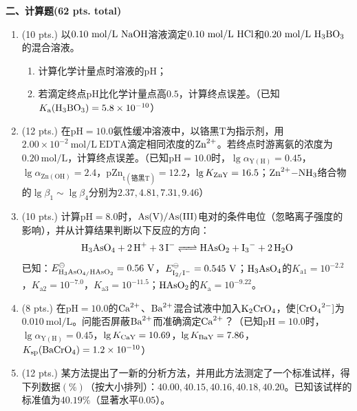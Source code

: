 \vspace{0.5cm}
\noindent\textbf{二、计算题(62 pts. total)}

\begin{enumerate}[label=\arabic*., itemsep=1.5ex]
    \item (10 pts.) 以$0.10\ \mathrm{mol/L}\ \ce{NaOH}$溶液滴定$0.10\ \mathrm{mol/L}\ \ce{HCl}$和$0.20\ \mathrm{mol/L}\ \ce{H3BO3}$的混合溶液。
    \begin{enumerate}[label=(\arabic*), noitemsep, topsep=0pt, partopsep=0pt]
        \item 计算化学计量点时溶液的$\mathrm{pH}$；
        \item 若滴定终点$\mathrm{pH}$比化学计量点高$0.5$，计算终点误差。（已知$K_\mathrm{a}(\ce{H3BO3})=5.8\times10^{-10}$）
    \end{enumerate}
    \item (12 pts.) 在$\mathrm{pH}=10.0$氨性缓冲溶液中，以铬黑$\mathrm{T}$为指示剂，用$2.00\times10^{-2}\ \mathrm{mol/L}\ \mathrm{EDTA}$滴定相同浓度的$\ce{Zn^{2+}}$。若终点时游离氨的浓度为$0.20\ \mathrm{mol/L}$，计算终点误差。（已知$\mathrm{pH}=10.0$时，$\lg\alpha_{\mathrm{Y(H)}}=0.45$，$\lg\alpha_{\mathrm{Zn(OH)}}=2.4$，$\mathrm{pZn_{t(\text{铬黑T})}}=12.2$，$\lg K_{\ce{ZnY}}=16.5$；$\ce{Zn^{2+}-NH3}$络合物的$\lg\beta_1 \sim \lg\beta_4$分别为$2.37, 4.81, 7.31, 9.46$）
    \item (10 pts.) 计算$\mathrm{pH}=8.0$时，$\ce{As(V)/As(III)}$电对的条件电位（忽略离子强度的影响），并从计算结果判断以下反应的方向：
    \[
    \ce{H3AsO4 + 2H+ + 3I- <=> HAsO2 + I3- + 2H2O}
    \]
    已知：$E^\ominus_{\ce{H3AsO4/HAsO2}}=0.56\ \mathrm{V}$，$E^\ominus_{\ce{I2/I-}}=0.545\ \mathrm{V}$；$\ce{H3AsO4}$的$K_{\mathrm{a1}}=10^{-2.2}$，$K_{\mathrm{a2}}=10^{-7.0}$，$K_{\mathrm{a3}}=10^{-11.5}$；$\ce{HAsO2}$的$K_\mathrm{a}=10^{-9.22}$。
    \item (8 pts.) 在$\mathrm{pH}=10.0$的$\ce{Ca^{2+}}$、$\ce{Ba^{2+}}$混合试液中加入$\ce{K2CrO4}$，使$[\ce{CrO4^{2-}}]$为$0.010\ \mathrm{mol/L}$。问能否屏蔽$\ce{Ba^{2+}}$而准确滴定$\ce{Ca^{2+}}$？（已知$\mathrm{pH}=10.0$时，$\lg\alpha_{\mathrm{Y(H)}}=0.45$，$\lg K_{\ce{CaY}}=10.69$，$\lg K_{\ce{BaY}}=7.86$，$K_{\mathrm{sp}}(\ce{BaCrO4})=1.2\times10^{-10}$）
    \item (12 pts.) 某方法提出了一新的分析方法，并用此方法测定了一个标准试样，得下列数据$(\%)$（按大小排列）：$40.00, 40.15, 40.16, 40.18, 40.20$。已知该试样的标准值为$40.19\%$（显著水平$0.05$）。
    \begin{enumerate}[label=(\arabic*), noitemsep, topsep=0pt, partopsep=0pt]

\end{enumerate}
\end{enumerate}
